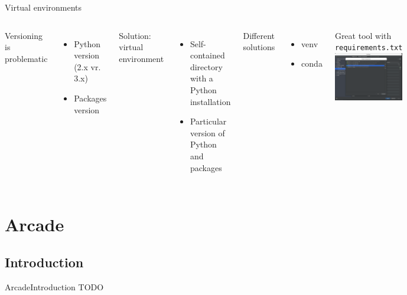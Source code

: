 \documentclass[10pt,compress]{beamer} %
\begin{document}
\begin{frame}{Virtual environments}
	\begin{columns}
            Versioning is problematic
            \begin{itemize}
                \item Python version (2.x vr. 3.x)
                \item Packages version
            \end{itemize}
            Solution: \alert{virtual environment}
            \begin{itemize}
                \item Self-contained directory with a Python installation
                \item Particular version of Python and packages
            \end{itemize}
        	Different solutions
            \begin{itemize}
                \item venv
                \item conda
            \end{itemize}
            Great tool with \texttt{requirements.txt}
	        \includegraphics[width=\linewidth]{figs/venv.png}\\
	\end{columns}
\end{frame}

\section{Arcade}
\subsection{Introduction}

\begin{frame}{Arcade}{Introduction}
	TODO
\end{frame}
\end{document}
